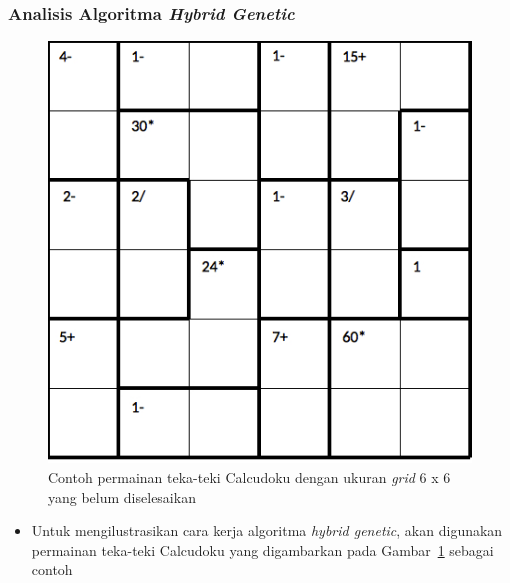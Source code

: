 \documentclass{beamer}
\begin{document}
\begin{frame}
\frametitle{Analisis Algoritma \textit{Hybrid Genetic}}
\begin{figure}
\centering
\captionsetup{justification=centering}
\includegraphics[scale=0.33]{Gambar/hybridgenetic/Puzzle}
\caption[Contoh permainan teka-teki Calcudoku dengan ukuran \textit{grid} 6 x 6 yang belum diselesaikan]{Contoh permainan teka-teki Calcudoku dengan ukuran \textit{grid} 6 x 6 yang belum diselesaikan}
\label{fig:analisishg1}
\end{figure}
\begin{itemize}
\item Untuk mengilustrasikan cara kerja algoritma \textit{hybrid genetic}, akan digunakan permainan teka-teki Calcudoku yang digambarkan pada Gambar~\ref{fig:analisishg1} sebagai contoh
\end{itemize}
\end{frame}

\end{document}
